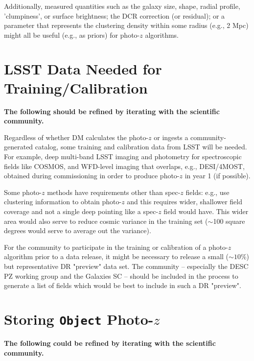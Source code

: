 \documentclass[DM,lsstdraft,toc]{lsstdoc}
\begin{document}
Additionally, measured quantities such as the galaxy size, shape, radial profile, 'clumpiness', or surface brightness; the DCR correction (or residual); or a parameter that represents the clustering density within some radius (e.g., 2 Mpc) might all be useful (e.g., as priors) for photo-$z$ algorithms. 



\clearpage
\section{LSST Data Needed for Training/Calibration}\label{sec:calib}

{\bf The following should be refined by iterating with the scientific community.}

Regardless of whether DM calculates the photo-$z$ or ingests a community-generated catalog, some training and calibration data from LSST will be needed.
For example, deep multi-band LSST imaging and photometry for spectroscopic fields like COSMOS, and WFD-level imaging that overlaps, e.g., DESI/4MOST, obtained during commissioning in order to produce photo-$z$ in year 1 (if possible).

Some photo-$z$ methods have requirements other than spec-$z$ fields: e.g., \citet{2019MNRAS.483.2801S} use clustering information to obtain photo-$z$ and this requires wider, shallower field coverage and not a single deep pointing like a spec-$z$ field would have. 
This wider area would also serve to reduce cosmic variance in the training set ($\sim$100 square degrees would serve to average out the variance).

For the community to participate in the training or calibration of a photo-$z$ algorithm prior to a data release, it might be necessary to release a small ($\sim10\%$) but representative DR "preview" data set.
The community -- especially the DESC PZ working group and the Galaxies SC -- should be included in the process to generate a list of fields which would be best to include in such a DR "preview".


\clearpage
\section{Storing {\tt Object} Photo-$z$}\label{sec:store}

{\bf The following could be refined by iterating with the scientific community.}
\end{document}
